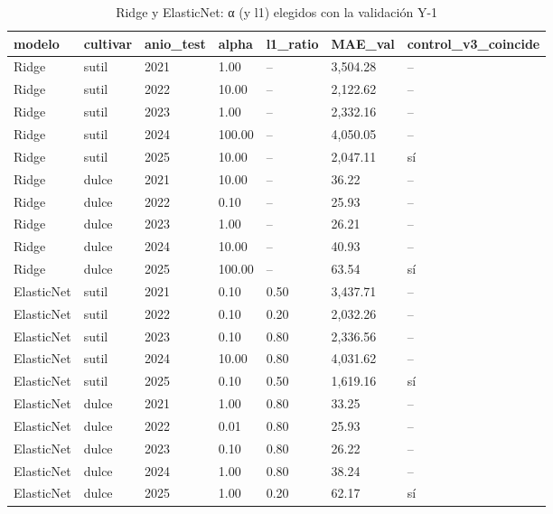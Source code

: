 \begin{table}[H]
\centering
\small
\caption{Ridge y ElasticNet: α (y l1) elegidos con la validación Y-1}
\label{tab:T21_lineales_hiperparametros}
\begin{tabular}{lllllll}
\toprule
modelo & cultivar & anio\_test & alpha & l1\_ratio & MAE\_val & control\_v3\_coincide \\
\midrule
Ridge & sutil & 2021 & 1.00 & -- & 3,504.28 & -- \\
Ridge & sutil & 2022 & 10.00 & -- & 2,122.62 & -- \\
Ridge & sutil & 2023 & 1.00 & -- & 2,332.16 & -- \\
Ridge & sutil & 2024 & 100.00 & -- & 4,050.05 & -- \\
Ridge & sutil & 2025 & 10.00 & -- & 2,047.11 & sí \\
Ridge & dulce & 2021 & 10.00 & -- & 36.22 & -- \\
Ridge & dulce & 2022 & 0.10 & -- & 25.93 & -- \\
Ridge & dulce & 2023 & 1.00 & -- & 26.21 & -- \\
Ridge & dulce & 2024 & 10.00 & -- & 40.93 & -- \\
Ridge & dulce & 2025 & 100.00 & -- & 63.54 & sí \\
ElasticNet & sutil & 2021 & 0.10 & 0.50 & 3,437.71 & -- \\
ElasticNet & sutil & 2022 & 0.10 & 0.20 & 2,032.26 & -- \\
ElasticNet & sutil & 2023 & 0.10 & 0.80 & 2,336.56 & -- \\
ElasticNet & sutil & 2024 & 10.00 & 0.80 & 4,031.62 & -- \\
ElasticNet & sutil & 2025 & 0.10 & 0.50 & 1,619.16 & sí \\
ElasticNet & dulce & 2021 & 1.00 & 0.80 & 33.25 & -- \\
ElasticNet & dulce & 2022 & 0.01 & 0.80 & 25.93 & -- \\
ElasticNet & dulce & 2023 & 0.10 & 0.80 & 26.22 & -- \\
ElasticNet & dulce & 2024 & 1.00 & 0.80 & 38.24 & -- \\
ElasticNet & dulce & 2025 & 1.00 & 0.20 & 62.17 & sí \\
\bottomrule
\end{tabular}
\end{table}